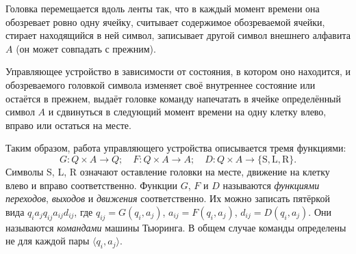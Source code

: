 \begin{figure}[H]
    \centering
\end{figure}
Головка перемещается вдоль ленты так, что в каждый момент времени она обозревает ровно одну ячейку, считывает содержимое обозреваемой ячейки, стирает находящийся в ней символ, записывает другой символ внешнего алфавита $A$ (он может совпадать с прежним).

Управляющее устройство в зависимости от состояния, в котором оно находится, и обозреваемого головкой символа изменяет своё внутреннее состояние или остаётся в прежнем, выдаёт головке команду напечатать в ячейке определённый символ $A$ и сдвинуться в следующий момент времени на одну клетку влево, вправо или остаться на месте.

Таким образом, работа управляющего устройства описывается тремя функциями:
\[
    G\colon Q\times A \to Q; \quad F\colon Q\times A \to A; \quad D\colon Q\times A \to \{\text{S}, \text{L}, \text{R}\}.
\]
Символы S, L, R означают оставление головки на месте, движение на клетку влево и вправо соответственно. Функции $G$, $F$ и $D$ называются \textit{функциями переходов}, \textit{выходов} и \textit{движения} соответственно. Их можно записать пятёркой вида $q_ia_jq_{ij}a_{ij}d_{ij}$, где $q_{ij} = G(q_i, a_j)$, $a_{ij} = F(q_i, a_j)$, $d_{ij} = D(q_i, a_j)$. Они называются \textit{командами} машины Тьюринга. В общем случае команды определены не для каждой пары $\langle q_i, a_j\rangle$.


